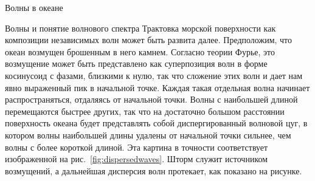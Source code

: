 \begin{chapter}{Волны в океане}
\begin{section}{Волны и понятие волнового спектра}
Трактовка морской поверхности как композиции независимых волн может быть
развита далее. Предположим, что океан возмущен брошенным в него камнем.
Согласно теории Фурье, это возмущение может быть представлено как
суперпозиция волн в форме косинусоид с фазами, близкими к нулю, так что 
сложение этих волн и дает нам явно выраженный пик в начальной точке. 
Каждая такая отдельная волна начинает распространяться, отдаляясь от 
начальной точки. Волны с наибольшей длиной перемещаются быстрее других, 
так что на достаточно большом расстоянии поверхность океана будет 
представлять собой диспергированный волновой цуг, в котором волны наибольшей 
длины удалены от начальной точки сильнее, чем волны с более короткой длиной. 
Эта картина в точности соответствует изображенной на 
рис.~\ref{fig:dispersedwaves}. Шторм служит источником возмущений, а 
дальнейшая дисперсия волн протекает, как показано на рисунке.
%


\end{section}
\end{chapter}
